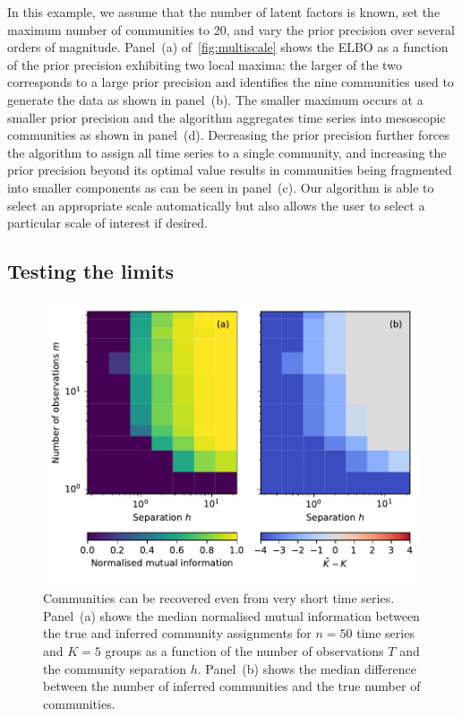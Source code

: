 \documentclass[onecolumn,pre,superscriptaddress, longbibliography, nofootinbib, notitlepage]{revtex4-1}
\begin{document}
In this example, we assume that the number of latent factors is known, set the maximum number of communities to 20, and vary the prior precision over several orders of magnitude. 
Panel~(a) of~\cref{fig:multiscale} shows the ELBO as a function of the prior precision exhibiting two local maxima: the larger of the two corresponds to a large prior precision and identifies the nine communities used to generate the data as shown in panel~(b). The smaller maximum occurs at a smaller prior precision and the algorithm aggregates time series into mesoscopic communities as shown in panel~(d). Decreasing the prior precision further forces the algorithm to assign all time series to a single community, and increasing the prior precision beyond its optimal value results in communities being fragmented into smaller components as can be seen in panel~(c). Our algorithm is able to select an appropriate scale automatically but also allows the user to select a particular scale of interest if desired.

\subsection{Testing the limits\label{sec:simulation-limits}}

\begin{figure}
    \includegraphics{sensitivity.pdf}
    \caption{\label{fig:sensitivity} Communities can be recovered even from very short time series. Panel~(a) shows the median normalised mutual information between the true and inferred community assignments for $n=50$ time series and $K=5$ groups as a function of the number of observations $T$ and the community separation $h$. Panel~(b) shows the median difference between the number of inferred communities and the true number of communities.}
\end{figure}
\end{document}
